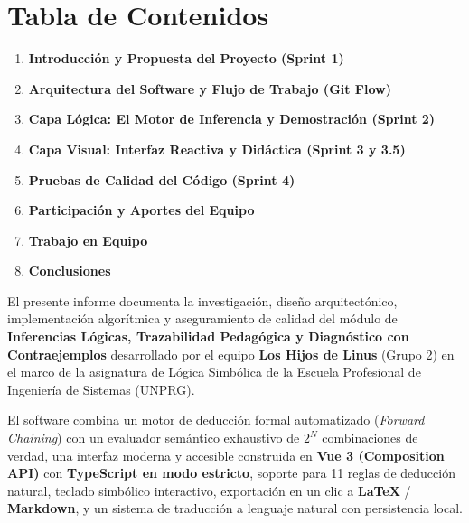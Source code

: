\documentclass[11pt,a4paper]{article}
\begin{document}
\newpage
\section*{Tabla de Contenidos}
\vspace{0.5cm}
\begin{enumerate}[label=\textbf{\arabic*.}]
    \setlength{\itemsep}{0.35cm}
    \item \textbf{Introducción y Propuesta del Proyecto (Sprint 1)}
    \item \textbf{Arquitectura del Software y Flujo de Trabajo (Git Flow)}
    \item \textbf{Capa Lógica: El Motor de Inferencia y Demostración (Sprint 2)}
    \item \textbf{Capa Visual: Interfaz Reactiva y Didáctica (Sprint 3 y 3.5)}
    \item \textbf{Pruebas de Calidad del Código (Sprint 4)}
    \item \textbf{Participación y Aportes del Equipo}
    \item \textbf{Trabajo en Equipo}
    \item \textbf{Conclusiones}
\end{enumerate}

\vspace{1.5cm}
\begin{tcolorbox}[colback=lightbg,colframe=bordergray,arc=2mm,title=\textbf{Resumen Ejecutivo}]
El presente informe documenta la investigación, diseño arquitectónico, implementación algorítmica y aseguramiento de calidad del módulo de \textbf{Inferencias Lógicas, Trazabilidad Pedagógica y Diagnóstico con Contraejemplos} desarrollado por el equipo \textbf{Los Hijos de Linus} (Grupo 2) en el marco de la asignatura de Lógica Simbólica de la Escuela Profesional de Ingeniería de Sistemas (UNPRG).

El software combina un motor de deducción formal automatizado (\textit{Forward Chaining}) con un evaluador semántico exhaustivo de $2^N$ combinaciones de verdad, una interfaz moderna y accesible construida en \textbf{Vue 3 (Composition API)} con \textbf{TypeScript en modo estricto}, soporte para 11 reglas de deducción natural, teclado simbólico interactivo, exportación en un clic a \textbf{\LaTeX} / \textbf{Markdown}, y un sistema de traducción a lenguaje natural con persistencia local.
\end{tcolorbox}
\end{document}
